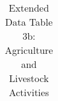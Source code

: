\begin{longtable}{llcccccccccc}
\caption{Extended Data Table 3b: Agriculture and Livestock Activities} \label{tab:pap__d3_newb} \\                                                                                                                                                                                                                                                                                                                                                                                                                                                                                                                                                                                                                                                                                                                                                                                                                
\hline \hline                                                                                                                                                                                                                                                                                                                                                                                                                                                                                                                                                                                                                                                                                                                                                                                                                                                                                                     

\end{longtable}
